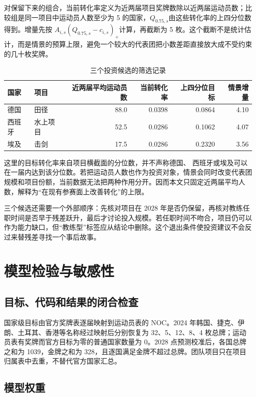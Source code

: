 \documentclass[UTF8,11pt,a4paper]{ctexart}
\begin{document}
对保留下来的组合，当前转化率定义为近两届项目奖牌数除以近两届运动员数；比较组是同一项目中运动员人数至少为 5 的国家，$Q_{0.75,s}$由这些转化率的上四分位数得到。增量先按 $A_{i,s}(Q_{0.75,s}-c_{i,s})_+$计算，再截断为 5 枚。这个截断不是统计估计，而是情景的预算上限，避免一个较大的代表团把小数差距直接放大成不受约束的几十枚奖牌。

\begin{table}[H]
\centering
\caption{三个投资候选的筛选记录}
\label{tab:investment-screen}
\small
\begin{tabular}{llrrrr}
\toprule
国家 & 项目 & 近两届平均运动员数 & 当前转化率 & 上四分位目标 & 情景增量\\
\midrule
德国 & 田径 & 88.0 & 0.0398 & 0.0864 & 4.10\\
西班牙 & 水上项目 & 52.5 & 0.0286 & 0.1062 & 4.07\\
埃及 & 击剑 & 17.5 & 0.0286 & 0.2320 & 3.56\\
\bottomrule
\end{tabular}
\end{table}

这里的目标转化率来自项目横截面的分位数，并不声称德国、 西班牙或埃及可以在一届内达到该分位数。若把运动员人数也作为投资对象，情景会同时改变代表团规模和项目份额，当前数据无法把两种作用分开。因而本文只固定近两届平均人数，解释为“在现有参赛面上改善转化”的上限。

三个候选还需要一个外部顺序：先核对项目在 2028 年是否仍保留，再核对教练任职时间是否早于残差跃升，最后才讨论投入规模。若任职时间不吻合，项目仍可以作为能力缺口，但“教练型”标签应从结论中删除。这个退出条件使投资建议不会反过来替残差寻找一个事后故事。

\label{mcm-q4-end}
\section{模型检验与敏感性}

\subsection{目标、代码和结果的闭合检查}

国家级目标由官方奖牌表逐届映射到运动员表的 NOC。2024 年韩国、捷克、伊朗、土耳其、香港等名称经过映射后分别恢复为 32、5、12、8、4 枚总牌；运动员表有奖牌而官方目标为零的普通国家数量为 0。2028 点预测校准后，各国总牌之和为 1039，金牌之和为 328，且逐国满足金牌不超过总牌。团队项目只在项目归属表中去重，不替代官方国家汇总。

\subsection{模型权重}
\end{document}
